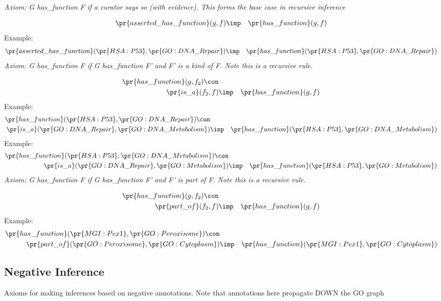 \emph{Axiom: G has\_function F if a curator says so (with evidence). This forms the base case in recursive inference}

\begin{eqnarray*}
 \pr{asserted\_has\_function}(g, f) &\imp & \pr{has\_function}(g, f) 
\end{eqnarray*}
Example: \begin{eqnarray*}
 \pr{asserted\_has\_function}( \pr{HSA:P53},  \pr{GO:DNA\_Repair}) &\imp & \pr{has\_function}( \pr{HSA:P53},  \pr{GO:DNA\_Repair}) 
\end{eqnarray*}
\emph{Axiom: G has\_function F if G has\_function F' and F' is a kind of F. Note this is a recursive rule.}

\begin{eqnarray*}
 \pr{has\_function}(g, f_2) \con \\
 \pr{is\_a}(f_2, f) &\imp & \pr{has\_function}(g, f) 
\end{eqnarray*}
Example: \begin{eqnarray*}
 \pr{has\_function}( \pr{HSA:P53},  \pr{GO:DNA\_Repair}) \con \\
 \pr{is\_a}( \pr{GO:DNA\_Repair},  \pr{GO:DNA\_Metabolism}) &\imp & \pr{has\_function}( \pr{HSA:P53},  \pr{GO:DNA\_Metabolism}) 
\end{eqnarray*}
Example: \begin{eqnarray*}
 \pr{has\_function}( \pr{HSA:P53},  \pr{GO:DNA\_Metabolism}) \con \\
 \pr{is\_a}( \pr{GO:DNA\_Repair},  \pr{GO:Metabolism}) &\imp & \pr{has\_function}( \pr{HSA:P53},  \pr{GO:Metabolism}) 
\end{eqnarray*}
\emph{Axiom: G has\_function F if G has\_function F' and F' is part of F. Note this is a recursive rule.}

\begin{eqnarray*}
 \pr{has\_function}(g, f_2) \con \\
 \pr{part\_of}(f_2, f) &\imp & \pr{has\_function}(g, f) 
\end{eqnarray*}
Example: \begin{eqnarray*}
 \pr{has\_function}( \pr{MGI:Pex1},  \pr{GO:Peroxisome}) \con \\
 \pr{part\_of}( \pr{GO:Peroxisome},  \pr{GO:Cytoplasm}) &\imp & \pr{has\_function}( \pr{MGI:Pex1},  \pr{GO:Cytoplasm}) 
\end{eqnarray*}
\subsection{Negative Inference}
Axioms for making inferences based
on negative annotations. Note that annotations here propagate DOWN
the GO graph
